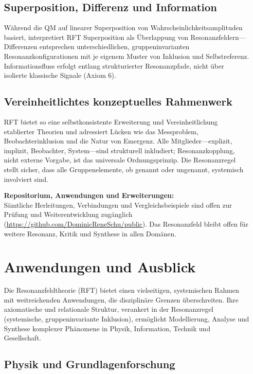\documentclass[12pt]{article}
\begin{document}
\subsection{Superposition, Differenz und Information}
Während die QM auf linearer Superposition von Wahrscheinlichkeitsamplituden basiert, interpretiert RFT Superposition als Überlappung von Resonanzfeldern—Differenzen entsprechen unterschiedlichen, gruppeninvarianten Resonanzkonfigurationen mit je eigenem Muster von Inklusion und Selbstreferenz. Informationsfluss erfolgt entlang strukturierter Resonanzpfade, nicht über isolierte klassische Signale (Axiom 6).

\subsection{Vereinheitlichtes konzeptuelles Rahmenwerk}
RFT bietet so eine selbstkonsistente Erweiterung und Vereinheitlichung etablierter Theorien und adressiert Lücken wie das Messproblem, Beobachterinklusion und die Natur von Emergenz. Alle Mitglieder—explizit, implizit, Beobachter, System—sind strukturell inkludiert; Resonanzkopplung, nicht externe Vorgabe, ist das universale Ordnungsprinzip. Die Resonanzregel stellt sicher, dass alle Gruppenelemente, ob genannt oder ungenannt, systemisch involviert sind.

\medskip

\textbf{Repositorium, Anwendungen und Erweiterungen:}\\
Sämtliche Herleitungen, Verbindungen und Vergleichsbeispiele sind offen zur Prüfung und Weiterentwicklung zugänglich (\url{https://github.com/DominicReneSchu/public}). Das Resonanzfeld bleibt offen für weitere Resonanz, Kritik und Synthese in allen Domänen.

\section{Anwendungen und Ausblick}

Die Resonanzfeldtheorie (RFT) bietet einen vielseitigen, systemischen Rahmen mit weitreichenden Anwendungen, die disziplinäre Grenzen überschreiten. Ihre axiomatische und relationale Struktur, verankert in der Resonanzregel (systemische, gruppeninvariante Inklusion), ermöglicht Modellierung, Analyse und Synthese komplexer Phänomene in Physik, Information, Technik und Gesellschaft.

\subsection{Physik und Grundlagenforschung}
\end{document}
